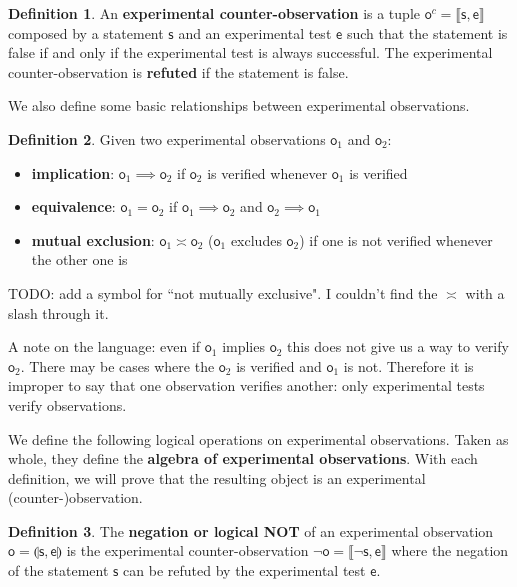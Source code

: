 \documentclass[review]{elsarticle}
\theoremstyle{plain}%
\theoremstyle{definition}
\newtheorem{defn}{Definition}[section]
\theoremstyle{remark}
\begin{document}
\begin{defn}
	An \textbf{experimental counter-observation} is a tuple $\mathsf{o}^c= \llbracket \mathsf{s}, \mathsf{e} \rrbracket$ composed by a statement $\mathsf{s}$ and an experimental test $\mathsf{e}$ such that the statement is false if and only if the experimental test is always successful. The experimental counter-observation is \textbf{refuted} if the statement is false.
\end{defn}

We also define some basic relationships between experimental observations.

\begin{defn}
	Given two experimental observations $\mathsf{o}_1$ and $\mathsf{o}_2$:
	\begin{itemize}
	\item \textbf{implication}: $\mathsf{o}_1 \implies \mathsf{o}_2$ if $\mathsf{o}_2$ is verified whenever $\mathsf{o}_1$ is verified
	\item \textbf{equivalence}: $\mathsf{o}_1 = \mathsf{o}_2$ if $\mathsf{o}_1 \implies \mathsf{o}_2$ and $\mathsf{o}_2 \implies \mathsf{o}_1$
	\item \textbf{mutual exclusion}: $\mathsf{o}_1 \asymp \mathsf{o}_2$ ($\mathsf{o}_1$ excludes $\mathsf{o}_2$) if one is not verified whenever the other one is
	\end{itemize}
\end{defn}
TODO: add a symbol for ``not mutually exclusive". I couldn't find the $\asymp$ with a slash through it. 


A note on the language: even if $\mathsf{o}_1$ implies $\mathsf{o}_2$ this does not give us a way to verify $\mathsf{o}_2$. There may be cases where the $\mathsf{o}_2$ is verified and $\mathsf{o}_1$ is not. Therefore it is improper to say that one observation verifies another: only experimental tests verify observations.






We define the following logical operations on experimental observations. Taken as whole, they define the \textbf{algebra of experimental observations}. With each definition, we will prove that the resulting object is an experimental (counter-)observation. 

\begin{defn}
	The \textbf{negation or logical NOT} of an experimental observation $\mathsf{o}=\llparenthesis \mathsf{s}, \mathsf{e}\rrparenthesis$ is the experimental counter-observation $\neg \mathsf{o}=\llbracket\neg \mathsf{s}, \mathsf{e}\rrbracket$ where the negation of the statement $\mathsf{s}$ can be refuted by the experimental test $\mathsf{e}$.
\end{defn}
\end{document}

